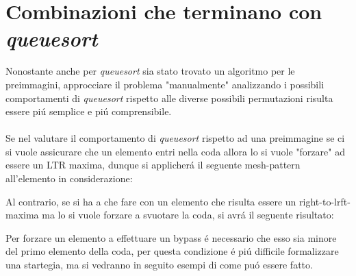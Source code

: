 \section*{Combinazioni che terminano con \textit{queuesort}}
Nonostante anche per \textit{queuesort} sia stato trovato un algoritmo per le preimmagini\cite{magnusson2013sorting}, approcciare il problema "manualmente" analizzando i possibili comportamenti di \textit{queuesort} rispetto alle diverse possibili permutazioni risulta essere pi\'u semplice e pi\'u comprensibile.\\\\
Se nel valutare il comportamento di \textit{queuesort} rispetto ad una preimmagine se ci si vuole assicurare che un elemento entri nella coda allora lo si vuole "forzare" ad essere un LTR maxima, dunque si applicher\'a il seguente mesh-pattern all'elemento in considerazione:
\begin{center}
\end{center}
Al contrario, se si ha a che fare con un elemento che risulta essere un right-to-lrft-maxima ma lo si vuole forzare a svuotare la coda, si avr\'a il seguente risultato:
\begin{center}
\end{center}
Per forzare un elemento a effettuare un bypass \'e necessario che esso sia minore del primo elemento della coda, per questa condizione \'e pi\'u difficile formalizzare una startegia, ma si vedranno in seguito esempi di come pu\'o essere fatto. 
